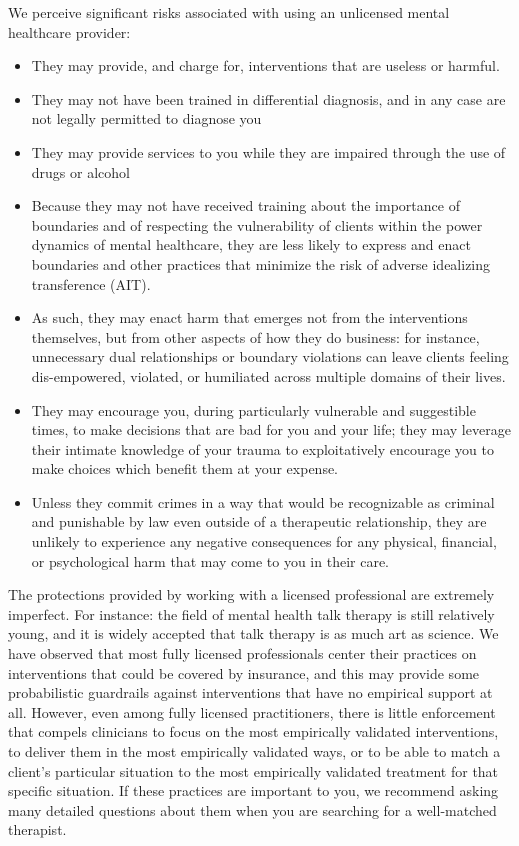 \documentclass[12pt,letterpaper]{book}
\begin{document}
We perceive significant risks associated with using an unlicensed mental healthcare provider:
\begin{itemize}
    \item They may provide, and charge for, interventions that are useless or harmful.
    \item They may not have been trained in differential diagnosis, and in any case are not legally permitted to diagnose you
    \item They may provide services to you while they are impaired through the use of drugs or alcohol
    \item Because they may not have received training about the importance of boundaries and of respecting the vulnerability of clients within the power dynamics of mental healthcare, they are less likely to express and enact boundaries and other practices that minimize the risk of adverse idealizing transference (AIT).
    \item As such, they may enact harm that emerges not from the interventions themselves, but from other aspects of how they do business: for instance, unnecessary dual relationships or boundary violations can leave clients feeling dis-empowered, violated, or humiliated across multiple domains of their lives.
    \item They may encourage you, during particularly vulnerable and suggestible times, to make decisions that are bad for you and your life; they may leverage their intimate knowledge of your trauma to exploitatively encourage you to make choices which benefit them at your expense.
    \item Unless they commit crimes in a way that would be recognizable as criminal and punishable by law even outside of a therapeutic relationship, they are unlikely to experience any negative consequences for any physical, financial, or psychological harm that may come to you in their care.
\end{itemize}

The protections provided by working with a licensed professional are extremely imperfect. For instance: the field of mental health talk therapy is still relatively young, and it is widely accepted that talk therapy is as much art as science. We have observed that most fully licensed professionals center their practices on interventions that could be covered by insurance, and this may provide some probabilistic guardrails against interventions that have no empirical support at all. However, even among fully licensed practitioners, there is little enforcement that compels clinicians to focus on the most empirically validated interventions, to deliver them in the most empirically validated ways, or to be able to match a client's particular situation to the most empirically validated treatment for that specific situation. If these practices are important to you, we recommend asking many detailed questions about them when you are searching for a well-matched therapist. 
\end{document}
